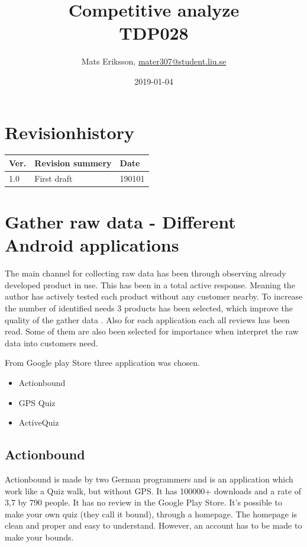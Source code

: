 \documentclass{TDP003mall}
\author{Mats Eriksson, \url{mater307@student.liu.se}}
\title{Competitive analyze \\ TDP028}
\date{2019-01-04}
\begin{document}
\projectpage
\section*{Revisionhistory}
\begin{table}[!h]
\begin{tabularx}{\linewidth}{|l|X|l|}
\hline
Ver. & Revision summery & Date \\\hline
1.0 & First draft & 190101 \\\hline
\end{tabularx}
\end{table}


\tableofcontents
\listoffigures
\listoftables
\pagebreak

\section{Gather raw data - Different Android applications}
The main channel for collecting raw data has been through observing already developed product
in use. This has been in a total active response. Meaning the author has actively tested each
product without any customer nearby. To increase the number of identified needs 3 products has
been selected, which improve the quality of the gather data \cite[chapter 4, p.63]{UlrichEppinger}.
Also for each application each all reviews has been read. Some of them are also been selected for importance
when interpret the raw data into customers need.

From Google play Store three application was chosen.
\begin{itemize}
	\item Actionbound
	\item GPS Quiz
	\item ActiveQuiz
\end{itemize}

 \subsection{Actionbound}
 Actionbound is made by two German programmers and is an application which work like a
 Quiz walk, but without GPS. It has 100000+ downloads and a rate of 3,7 by 790 people.
 It has no review in the Google Play Store. It's possible to make your own quiz (they
 call it bound), through a homepage. The homepage is clean and proper and easy to
 understand. However, an account has to be made to make your bounds.
\end{document}
